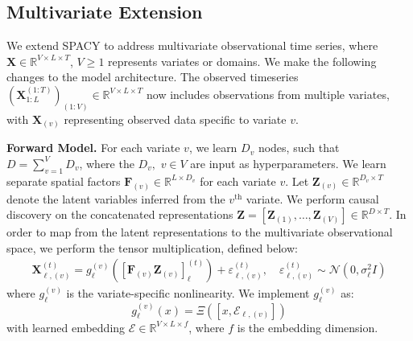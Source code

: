 \subsection{Multivariate Extension}
\label{app:multi-variate}

We extend SPACY to address multivariate observational time series, where $\mathbf{X} \in \mathbb{R}^{V\times L \times T}$, $V \geq 1$ represents variates or domains. We make the following changes to the model architecture.
The observed timeseries $\left(\mathbf{X}^{(1:T)}_{1:L}\right)_{(1:V)} \in \mathbb{R}^{V\times L \times T}$ now includes observations from multiple variates, with $\mathbf{X}_{(v)}$ representing observed data specific to variate $v$.

\textbf{Forward Model. } For each variate $v$, we learn $D_v$ nodes, such that $D = \sum_{v=1}^V D_v$, where the $D_v, \, \, v\in V$ are input as hyperparameters. We learn separate spatial factors $\mathbf{F}_{(v)} \in \mathbb{R}^{L \times D_v}$ for each variate $v$. Let $\mathbf{Z}_{(v)} \in \mathbb{R}^{D_v \times T}$ denote the latent variables inferred from the $v^\text{th}$ variate. We perform causal discovery on the concatenated representations $\mathbf{Z} = \left[ \mathbf{Z}_{(1)}, \ldots, \mathbf{Z}_{(V)} \right] \in \mathbb{R}^{D \times T}$. In order to map from the latent representations to the multivariate observational space, we perform the tensor multiplication, defined below:
\begin{align}
\mathbf{X}_{\ell, (v)}^{(t)} = g_\ell^{(v)} \left( \left[ \mathbf{F}_{(v)}\mathbf{Z}_{(v)} \right]_\ell^{(t)} \right) + \varepsilon_{\ell, (v)}^{(t)}, \quad
\varepsilon_{\ell, (v)}^{(t)} \sim \mathcal{N}(0, \sigma^2_\ell I)\label{eqn:multiv_decoder}
\end{align}
where $g_\ell^{(v)}$ is the variate-specific nonlinearity. We implement $g_\ell^{(v)}$ as:
\begin{equation*}
    g_\ell^{(v)}(x) = \Xi \left([x, \mathscr{E}_{\ell, (v)}] \right)
\end{equation*}
with learned embedding $\mathscr{E} \in \mathbb{R}^{V \times L \times f}$, where $f$ is the embedding dimension.



